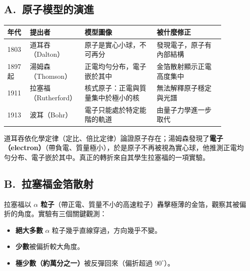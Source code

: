 \documentclass[11pt]{article}
\begin{document}
\subsection*{\sffamily A.\ 原子模型的演進}

\begin{center}
\renewcommand{\arraystretch}{1.35}
\begin{tabular}{p{0.10\linewidth} p{0.16\linewidth} p{0.32\linewidth} p{0.30\linewidth}}
\hline
\textbf{年代} & \textbf{提出者} & \textbf{模型圖像} & \textbf{被什麼修正} \\
\hline
1803 & 道耳吞（Dalton） & 原子是實心小球，不可再分 & 發現電子，原子有內部結構 \\
1897 起 & 湯姆森（Thomson） & 正電均勻分布，電子嵌於其中 & 金箔散射顯示正電高度集中 \\
1911 & 拉塞福（Rutherford） & 核式原子：正電與質量集中於極小的核 & 無法解釋原子穩定與光譜 \\
1913 & 波耳（Bohr） & 電子只能處於特定能階的軌道 & 由量子力學進一步取代 \\
\hline
\end{tabular}
\end{center}

道耳吞依化學定律（定比、倍比定律）論證原子存在；湯姆森發現了\textbf{電子（electron）}（帶負電、質量極小），於是原子不再被視為實心球，他推測正電均勻分布、電子嵌於其中。真正的轉折來自其學生拉塞福的一項實驗。

\subsection*{\sffamily B.\ 拉塞福金箔散射}

拉塞福以 \textbf{$\alpha$ 粒子}（帶正電、質量不小的高速粒子）轟擊極薄的金箔，觀察其被偏折的角度。實驗有三個關鍵觀測：

\begin{itemize}\setlength{\itemsep}{1pt}
\item \textbf{絕大多數} $\alpha$ 粒子幾乎直線穿過，方向幾乎不變。
\item \textbf{少數}被偏折較大角度。
\item \textbf{極少數（約萬分之一）}被反彈回來（偏折超過 $90^\circ$）。
\end{itemize}

\end{document}
